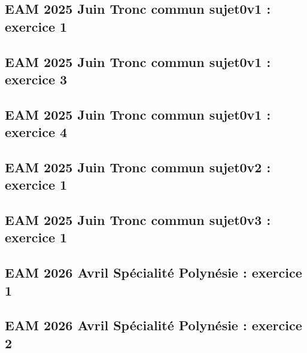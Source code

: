 \documentclass[lang=fr,edition=teacher,layout=sheet]{mxbook}
\begin{document}
\begingroup\endgroup
\par\bigskip
{}\subsection*{EAM 2025 Juin Tronc commun sujet0v1 : exercice 1}
\begingroup\endgroup
\par\bigskip
{}\subsection*{EAM 2025 Juin Tronc commun sujet0v1 : exercice 3}
\begingroup\endgroup
\par\bigskip
{}\subsection*{EAM 2025 Juin Tronc commun sujet0v1 : exercice 4}
\begingroup\endgroup
\par\bigskip
{}\subsection*{EAM 2025 Juin Tronc commun sujet0v2 : exercice 1}
\begingroup\endgroup
\par\bigskip
{}\subsection*{EAM 2025 Juin Tronc commun sujet0v3 : exercice 1}
\begingroup\endgroup
\par\bigskip
{}\subsection*{EAM 2026 Avril Spécialité Polynésie : exercice 1}
\begingroup\endgroup
\par\bigskip
{}\subsection*{EAM 2026 Avril Spécialité Polynésie : exercice 2}
\end{document}
